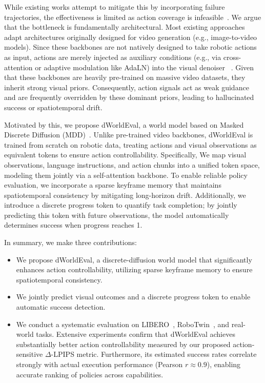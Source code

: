 While existing works attempt to mitigate this by incorporating failure trajectories, the effectiveness is limited as action coverage is infeasible~\cite{guo2025ctrl,ho20251x}. We argue that the bottleneck is fundamentally architectural. 
Most existing approaches adapt architectures originally designed for video generation (e.g., image-to-video models).
Since these backbones are not natively designed to take robotic actions as input, actions are merely injected as auxiliary conditions (e.g., via cross-attention or adaptive modulation like AdaLN) into the visual denoiser
~\cite{li2025worldeval,guo2025ctrl,quevedo2506worldgym}.
Given that these backbones are heavily pre-trained on massive video datasets, they inherit strong visual priors.
Consequently, action signals act as weak guidance and are frequently overridden by these dominant priors, leading to hallucinated success or spatiotemporal drift.

Motivated by this, we propose dWorldEval, a world model based on Masked Discrete Diffusion (MDD)~\cite{austin2021structured,sahoo2024simple,lou2023discrete,LLaDA,lavida,MMaDA}. 
Unlike pre-trained video backbones, dWorldEval is trained from scratch on robotic data, treating actions and visual observations as equivalent tokens to ensure action controllability.
Specifically, We map visual observations, language instructions, and action chunks into a unified token space, modeling them jointly via a self-attention backbone.
To enable reliable policy evaluation, we incorporate a sparse keyframe memory that maintains spatiotemporal consistency by mitigating long-horizon drift. Additionally, we introduce a discrete progress token to quantify task completion; by jointly predicting this token with future observations, the model automatically determines success when progress reaches 1.

In summary, we make three contributions:
\begin{itemize}
    \item We propose dWorldEval, a discrete-diffusion world model that significantly enhances action controllability, utilizing sparse keyframe memory to ensure spatiotemporal consistency.
    \item We jointly predict visual outcomes and a discrete progress token to enable automatic success detection.
    \item We conduct a systematic evaluation on LIBERO~\cite{liu2023libero}, RoboTwin~\cite{mu2025robotwin}, and real-world tasks. Extensive experiments confirm that dWorldEval achieves substantially better action controllability measured by our proposed action-sensitive $\Delta$-LPIPS metric. Furthermore, its estimated success rates correlate strongly with actual execution performance (Pearson $r \approx 0.9$), enabling accurate ranking of policies across capabilities.
\end{itemize}

